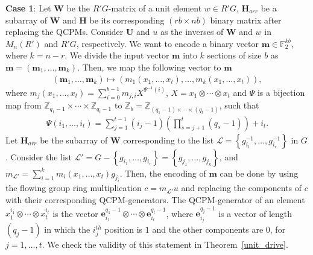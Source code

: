 \documentclass[journal,draftclsnofoot,onecolumn,12pt,twoside]{IEEEtran}
\begin{document}
\textbf{Case 1}: Let $\mathbf{W}$ be the $R'G$-matrix of a unit element $w\in R'G$, $\mathbf{H}_{arr}$ be a subarray of $\mathbf{W}$ and $\mathbf{H}$ be its corresponding $(rb\times nb)$ binary matrix after replacing the QCPMs. Consider $\mathbf{U}$ and $u$ as the inverses of $\mathbf{W}$ and $w$ in $M_n(R')$ and $R'G$, respectively.  We want to encode a binary vector $\mathbf{m}\in \mathbb{F}_2^{kb}$, where $k=n-r$. We divide the input vector $\mathbf{m}$ into $k$ sections of size $b$ as $\mathbf{m}=(\mathbf{m}_1,\ldots, \mathbf{m}_k)$.
    Then, we map the following vector to $\mathbf{m}$
\begin{eqnarray*}
(\mathbf{m}_1,\ldots ,\mathbf{m}_k)\mapsto \left(m_1(x_1,\ldots ,x_t),\ldots , m_k(x_1,\ldots ,x_t) \right),
\end{eqnarray*}
where $m_j(x_1,\ldots ,x_t)=\sum_{i=0}^{b-1} m_{j,i} X^{\Psi^{-1} (i)}$, $X=x_1\otimes \cdots \otimes x_t$ and $\Psi$ is a bijection map from $\mathbb{Z}_{q_1-1}\times \cdots \times \mathbb{Z}_{q_t-1}$ to $\mathbb{Z}_b= \mathbb{Z}_{(q_1-1)\times \cdots \times (q_t-1) }$, such that
\begin{eqnarray}\label{Psi_def}
\Psi \left(i_1,\ldots, i_t \right)=\sum_{j=1}^{t-1} \left(i_j-1\right)\left(\prod_{s=j+1}^t (q_s-1)\right)+i_t.
\end{eqnarray}
Let $\mathbf{H}_{arr}$ be the subarray of $\mathbf{W}$ corresponding to the list $\mathcal{L}=\left\lbrace g_{i_1}^{-1},\ldots ,g_{i_r}^{-1}\right\rbrace$ in $G$. Consider the list $\mathcal{L}'=G-\left\{  g_{i_1},\ldots ,g_{i_r} \right\}=\left\{  g_{j_1},\ldots ,g_{j_k} \right\}$, and $m_{\mathcal{L}'}=\sum_{i=1}^{k}m_i(x_1,\ldots,x_t)g_{j_i}$. Then, the encoding of $\mathbf{m}$ can be done by using the flowing group ring multiplication $c=m_{\mathcal{L}'}u$ and replacing the components of $c$ with their corresponding QCPM-generators. The QCPM-generator of an element $x_1^{i_1}\otimes \cdots \otimes x_t^{i_t}$ is the vector $\mathbf{e}_{i_1}^{q_1-1} \otimes \cdots \otimes \mathbf{e}_{i_t}^{q_t-1} $, where $\mathbf{e}_{i_j}^{q_j-1}$ is a vector of length $(q_j-1)$ in which the $i_j^{th}$ position is $1$ and the other components are $0$, for $j=1,\ldots,t$. We check the validity of this statement in Theorem~\ref{unit_drive}.
\end{document}
